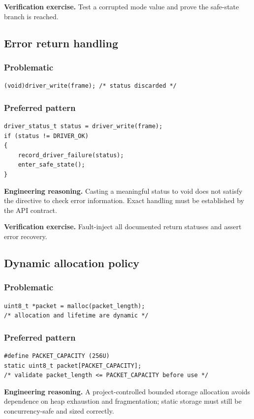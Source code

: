 \documentclass[10pt,letterpaper]{article}
\begin{document}
\textbf{Verification exercise.} Test a corrupted mode value and prove the safe-state branch is reached.

\subsection{Error return handling}
\subsubsection*{Problematic}
\begin{lstlisting}[style=engineerc]
(void)driver_write(frame); /* status discarded */
\end{lstlisting}
\subsubsection*{Preferred pattern}
\begin{lstlisting}[style=engineerc]
driver_status_t status = driver_write(frame);
if (status != DRIVER_OK)
{
    record_driver_failure(status);
    enter_safe_state();
}
\end{lstlisting}
\textbf{Engineering reasoning.} Casting a meaningful status to void does not satisfy the directive to check error information. Exact handling must be established by the API contract.

\textbf{Verification exercise.} Fault-inject all documented return statuses and assert error recovery.

\subsection{Dynamic allocation policy}
\subsubsection*{Problematic}
\begin{lstlisting}[style=engineerc]
uint8_t *packet = malloc(packet_length);
/* allocation and lifetime are dynamic */
\end{lstlisting}
\subsubsection*{Preferred pattern}
\begin{lstlisting}[style=engineerc]
#define PACKET_CAPACITY (256U)
static uint8_t packet[PACKET_CAPACITY];
/* validate packet_length <= PACKET_CAPACITY before use */
\end{lstlisting}
\textbf{Engineering reasoning.} A project-controlled bounded storage allocation avoids dependence on heap exhaustion and fragmentation; static storage must still be concurrency-safe and sized correctly.
\end{document}
